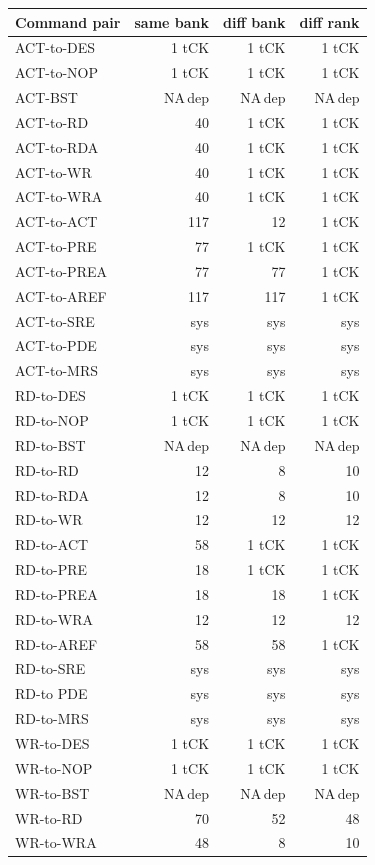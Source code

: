 {\footnotesize\begin{longtable}{@{}l r r r@{}}
\toprule \textbf{Command pair} & \textbf{same bank} & \textbf{diff bank} & \textbf{diff rank}\\ \midrule \endhead
ACT-to-DES & 1 tCK & 1 tCK & 1 tCK\\
ACT-to-NOP & 1 tCK & 1 tCK & 1 tCK\\
ACT-BST & NA\,dep & NA\,dep & NA\,dep\\
ACT-to-RD & 40 & 1 tCK & 1 tCK\\
ACT-to-RDA & 40 & 1 tCK & 1 tCK\\
ACT-to-WR & 40 & 1 tCK & 1 tCK\\
ACT-to-WRA & 40 & 1 tCK & 1 tCK\\
ACT-to-ACT & 117 & 12 & 1 tCK\\
ACT-to-PRE & 77 & 1 tCK & 1 tCK\\
ACT-to-PREA & 77 & 77 & 1 tCK\\
ACT-to-AREF & 117 & 117 & 1 tCK\\
ACT-to-SRE & sys & sys & sys\\
ACT-to-PDE & sys & sys & sys\\
ACT-to-MRS & sys & sys & sys\\
RD-to-DES & 1 tCK & 1 tCK & 1 tCK\\
RD-to-NOP & 1 tCK & 1 tCK & 1 tCK\\
RD-to-BST & NA\,dep & NA\,dep & NA\,dep\\
RD-to-RD & 12 & 8 & 10\\
RD-to-RDA & 12 & 8 & 10\\
RD-to-WR & 12 & 12 & 12\\
RD-to-ACT & 58 & 1 tCK & 1 tCK\\
RD-to-PRE & 18 & 1 tCK & 1 tCK\\
RD-to-PREA & 18 & 18 & 1 tCK\\
RD-to-WRA & 12 & 12 & 12\\
RD-to-AREF & 58 & 58 & 1 tCK\\
RD-to-SRE & sys & sys & sys\\
RD-to PDE & sys & sys & sys\\
RD-to-MRS & sys & sys & sys\\
WR-to-DES & 1 tCK & 1 tCK & 1 tCK\\
WR-to-NOP & 1 tCK & 1 tCK & 1 tCK\\
WR-to-BST & NA\,dep & NA\,dep & NA\,dep\\
WR-to-RD & 70 & 52 & 48\\
WR-to-WRA & 48 & 8 & 10\\

\end{longtable}}
